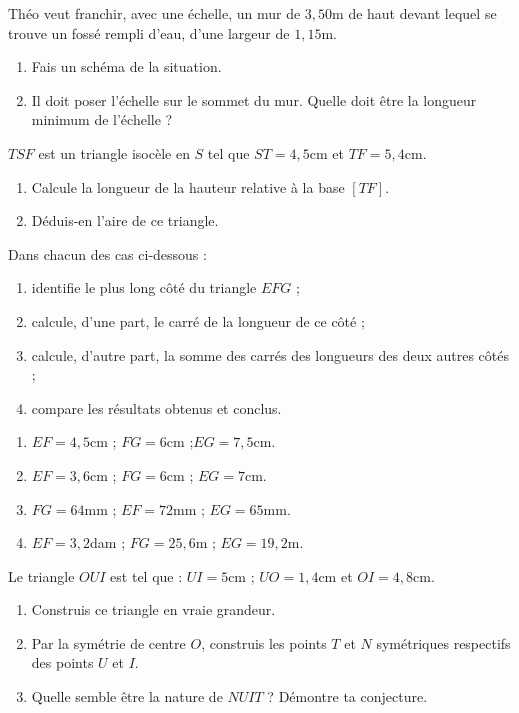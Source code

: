 \documentclass[a4paper,10pt]{report}
\begin{document}
\begin{ex}
Théo veut franchir, avec une échelle, un mur de $3,50$m de haut devant lequel se trouve un fossé rempli d'eau, d'une largeur de $1,15$m.
\begin{enumerate}[font=\color{exer2}]
\item Fais un schéma de la situation.
\item Il doit poser l'échelle sur le sommet du mur. Quelle doit être la longueur minimum de l'échelle ?
\end{enumerate}
\end{ex}

\begin{ex}
$TSF$ est un triangle isocèle en $S$ tel que $ST= 4,5$cm et $TF=5,4$cm.
\begin{enumerate}[font=\color{exer2}]
\item Calcule la longueur de la hauteur relative à la base $[TF]$.
\item Déduis-en l'aire de ce triangle.
\end{enumerate}
\end{ex}

\begin{ex}
Dans chacun des cas ci-dessous :
\begin{enumerate}[font=\color{exer2}]
\item[•]identifie le plus long côté du triangle $EFG$ ;
\item[•]calcule, d'une part, le carré de la longueur de ce côté ;
\item[•]calcule, d'autre part, la somme des carrés des longueurs des deux autres côtés ;
\item[•]compare les résultats obtenus et conclus.
\end{enumerate}
\begin{enumerate}[font=\color{exer2}]
\item $EF=4,5$cm ; $FG= 6$cm ;$ EG= 7,5$cm.
\item $EF= 3,6$cm ; $FG= 6$cm ; $EG= 7$cm.
\item $FG= 64$mm ; $EF= 72$mm ; $EG= 65$mm.
\item $EF= 3,2$dam ; $FG= 25,6$m ; $EG= 19,2$m.
\end{enumerate}
\end{ex}

\begin{ex}
Le triangle $OUI$ est tel que : $UI= 5$cm ; $UO=1,4$cm et $OI= 4,8$cm.
\begin{enumerate}[font=\color{exer2}]
\item Construis ce triangle en vraie grandeur.
\item Par la symétrie de centre $O$, construis les points $T$ et $N$ symétriques respectifs des points $U$ et $I$.
\item Quelle semble être la nature de $NUIT$ ? Démontre ta conjecture.
\end{enumerate}
\end{ex}
\end{document}
